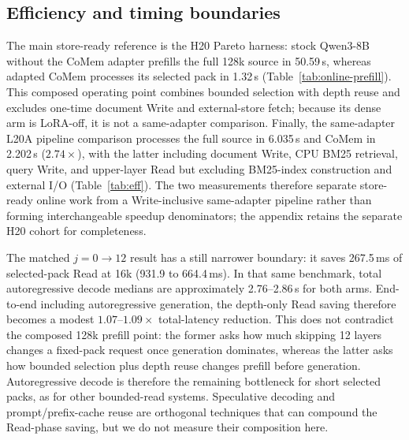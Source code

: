 \subsection{Efficiency and timing boundaries}
The main store-ready reference is the H20 Pareto harness: stock Qwen3-8B
without the CoMem adapter prefills the full 128k source in 50.59\,s, whereas
adapted CoMem processes its selected pack in 1.32\,s
(Table~\ref{tab:online-prefill}). This composed operating point combines bounded
selection with depth reuse and excludes one-time document Write and
external-store fetch; because its dense arm is LoRA-off, it is not a
same-adapter comparison. Finally, the same-adapter L20A pipeline comparison processes the full source in
6.035\,s and CoMem in 2.202\,s ($2.74\times$), with the latter including
document Write, CPU BM25 retrieval, query Write, and upper-layer Read but
excluding BM25-index construction and external I/O (Table~\ref{tab:eff}). The
two measurements therefore separate store-ready online work from a
Write-inclusive same-adapter pipeline rather than forming interchangeable
speedup denominators; the appendix retains the separate H20 cohort for
completeness.

The matched $j{=}0\!\rightarrow\!12$ result has a still narrower boundary: it
saves 267.5\,ms of selected-pack Read at 16k (931.9 to 664.4\,ms). In that
same benchmark, total autoregressive decode medians are approximately
2.76--2.86\,s for both arms. End-to-end including autoregressive generation,
the depth-only Read saving therefore becomes a modest $1.07$--$1.09\times$
total-latency reduction. This does not contradict the composed 128k prefill
point: the former asks how much skipping 12 layers changes a fixed-pack
request once generation dominates, whereas the latter asks how bounded
selection plus depth reuse changes prefill before generation. Autoregressive
decode is therefore the remaining bottleneck for short selected packs, as for
other bounded-read systems. Speculative decoding and prompt/prefix-cache reuse
are orthogonal techniques that can compound the Read-phase saving, but we do
not measure their composition here.
